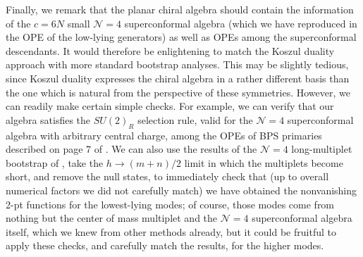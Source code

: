 \documentclass[../main.tex]{subfiles}
\begin{document}
Finally, we remark that the planar chiral algebra should contain the information of the $c=6N$ small $\mathcal{N}=4$ superconformal algebra (which we have reproduced in the OPE of the low-lying generators) as well as OPEs among the superconformal descendants. It would therefore be enlightening to match the Koszul duality approach with more standard bootstrap analyses. This may be slightly tedious, since Koszul duality expresses the chiral algebra in a rather different basis than the one which is natural from the perspective of these symmetries. However, we can readily make certain simple checks. For example, we can verify that our algebra satisfies the $SU(2)_R$ selection rule, valid for the $\mathcal{N}=4$ superconformal algebra with arbitrary central charge, among the OPEs of BPS primaries described on page 7 of \cite{Lin:2015wcg}. We can also use the results of the $\mathcal{N}=4$ long-multiplet bootstrap of \cite{Kos:2018glc}, take the $h \rightarrow (m+n)/2$ limit in which the multiplets become short, and remove the null states, to immediately check that (up to overall numerical factors we did not carefully match) we have obtained the nonvanishing 2-pt functions for the lowest-lying modes; of course, those modes come from nothing but the center of mass multiplet and the $\mathcal{N}=4$ superconformal algebra itself, which we knew from other methods already, but it could be fruitful to apply these checks, and carefully match the results, for the higher modes. 
\end{document}
